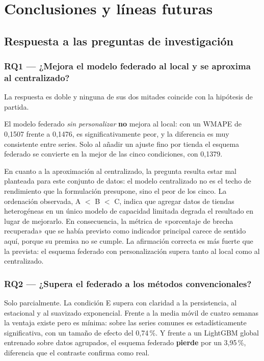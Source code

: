 \chapter{Conclusiones y líneas futuras}
\label{cap:conclusiones}

\section{Respuesta a las preguntas de investigación}

\subsection*{RQ1 — ¿Mejora el modelo federado al local y se aproxima al centralizado?}

La respuesta es doble y ninguna de sus dos mitades coincide con la hipótesis de partida.

El modelo federado \emph{sin personalizar} \textbf{no} mejora al local: con un WMAPE de 0,1507
frente a 0,1476, es significativamente peor, y la diferencia es muy consistente entre series. Solo
al añadir un ajuste fino por tienda el esquema federado se convierte en la mejor de las cinco
condiciones, con 0,1379.

En cuanto a la aproximación al centralizado, la pregunta resulta estar mal planteada para este
conjunto de datos: el modelo centralizado no es el techo de rendimiento que la formulación
presupone, sino el peor de los cinco. La ordenación observada, A $<$ B $<$ C, indica que agregar
datos de tiendas heterogéneas en un único modelo de capacidad limitada degrada el resultado en
lugar de mejorarlo. En consecuencia, la métrica de «porcentaje de brecha recuperada» que se había
previsto como indicador principal carece de sentido aquí, porque su premisa no se cumple. La
afirmación correcta es más fuerte que la prevista: el esquema federado con personalización supera
tanto al local como al centralizado.

\subsection*{RQ2 — ¿Supera el federado a los métodos convencionales?}

Solo parcialmente. La condición E supera con claridad a la persistencia, al estacional y al
suavizado exponencial. Frente a la media móvil de cuatro semanas la ventaja existe pero es mínima:
sobre las series comunes es estadísticamente significativa, con un tamaño de efecto del 0,74\,\%.
Y frente a un LightGBM global entrenado sobre datos agrupados, el esquema federado \textbf{pierde}
por un 3,95\,\%, diferencia que el contraste confirma como real.

